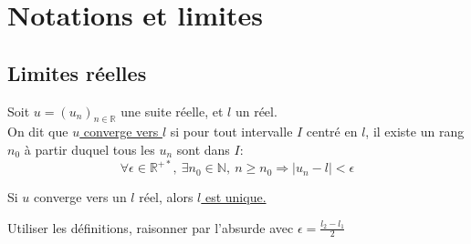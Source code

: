 \documentclass[12pt,twoside,a4paper]{article}
\begin{document}
	\section{Notations et limites}
		\subsection{Limites réelles}
			\begin{defi}
				Soit $u=(u_n)_{n\in\mathbb{R}}$ une suite réelle, et $l$ un réel.\\
				On dit que \underline{$u$ converge vers $l$} si pour tout intervalle $I$ centré en $l$, il existe un rang $n_0$ \`a partir duquel tous les $u_n$ sont dans $I$:
				$$\forall\epsilon\in\mathbb{R}^{+*},\ \exists n_0\in\mathbb{N},\ n\geqslant n_0\Rightarrow|u_n-l|<\epsilon$$
			\end{defi}
			\begin{prop}
				Si $u$ converge vers un $l$ réel, alors \underline{$l$ est unique.}
			\end{prop}
			\begin{preuve}
				Utiliser les définitions, raisonner par l'absurde avec $\epsilon=\frac{l_2-l_1}{2}$
			\end{preuve}
\end{document}
